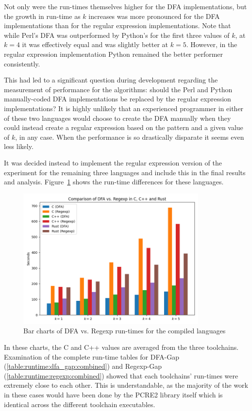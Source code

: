 Not only were the run-times themselves higher for the DFA implementations, but the growth in run-time as $k$ increases was more pronounced for the DFA implementations than for the regular expression implementations. Note that while Perl's DFA was outperformed by Python's for the first three values of $k$, at $k=4$ it was effectively equal and was slightly better at $k=5$. However, in the regular expression implementation Python remained the better performer consistently.

This had led to a significant question during development regarding the measurement of performance for the algorithms: should the Perl and Python manually-coded DFA implementations be replaced by the regular expression implementations? It is highly unlikely that an experienced programmer in either of these two languages would choose to create the DFA manually when they could instead create a regular expression based on the pattern and a given value of $k$, in any case. When the performance is so drastically disparate it seems even less likely.

It was decided instead to implement the regular expression version of the experiment for the remaining three languages and include this in the final results and analysis. Figure~\ref{fig:graph:dfa_regexp_comp2} shows the run-time differences for these languages.

\begin{figure}[h]
	\centering
	\includegraphics[width=0.85\textwidth]{figures/dfa_regexp_comp2.png}
	\caption{Bar charts of DFA vs. Regexp run-times for the compiled languages}
	\label{fig:graph:dfa_regexp_comp2}
\end{figure}

In these charts, the C and C++ values are averaged from the three toolchains. Examination of the complete run-time tables for DFA-Gap (\ref{table:runtime:dfa_gap:combined}) and Regexp-Gap (\ref{table:runtime:regexp:combined}) showed that each toolchains' run-times were extremely close to each other. This is understandable, as the majority of the work in these cases would have been done by the PCRE2 library itself which is identical across the different toolchain executables.

